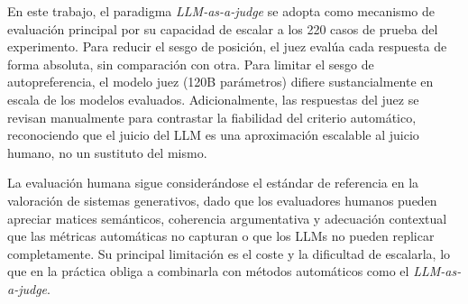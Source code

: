En este trabajo, el paradigma \textit{LLM-as-a-judge} se adopta como mecanismo de evaluación principal por su capacidad de escalar a los 220 casos de prueba del experimento. Para reducir el sesgo de posición, el juez evalúa cada respuesta de forma absoluta, sin comparación con otra. Para limitar el sesgo de autopreferencia, el modelo juez (120B parámetros) difiere sustancialmente en escala de los modelos evaluados. Adicionalmente, las respuestas del juez se revisan manualmente para contrastar la fiabilidad del criterio automático, reconociendo que el juicio del LLM es una aproximación escalable al juicio humano, no un sustituto del mismo.

La evaluación humana sigue considerándose el estándar de referencia en la valoración de sistemas generativos, dado que los evaluadores humanos pueden apreciar matices semánticos, coherencia argumentativa y adecuación contextual que las métricas automáticas no capturan \cite{celikyilmaz2020evaluation} o que los LLMs no pueden replicar completamente. Su principal limitación es el coste y la dificultad de escalarla, lo que en la práctica obliga a combinarla con métodos automáticos como el \textit{LLM-as-a-judge}.